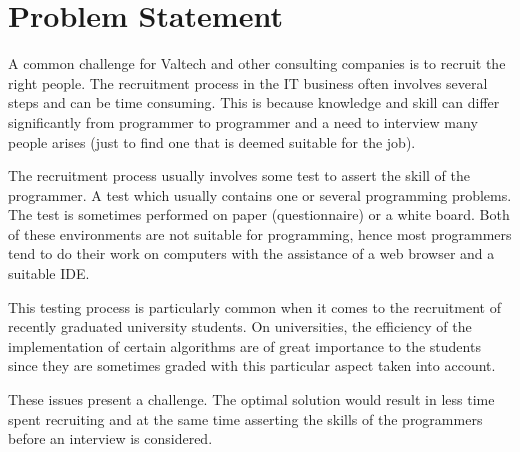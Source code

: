 \section{Problem Statement}
A common challenge for Valtech and other consulting companies is to recruit the right people. The recruitment process in the IT business often involves several steps and can be time consuming. This is because knowledge and skill can differ significantly from programmer to programmer and a need to interview many people arises (just to find one that is deemed suitable for the job).

The recruitment process usually involves some test to assert the skill of the programmer. A test which usually contains one or several programming problems. The test is sometimes performed on paper (questionnaire) or a white board. Both of these environments are not suitable for programming, hence most programmers tend to do their work on computers with the assistance of a web browser and a suitable IDE.

This testing process is particularly common when it comes to the recruitment of recently graduated university students. On universities, the efficiency of the implementation of certain algorithms are of great importance to the students since they are sometimes graded with this particular aspect taken into account.

These issues present a challenge. The optimal solution would result in less time spent recruiting and at the same time asserting the skills of the programmers before an interview is considered.
